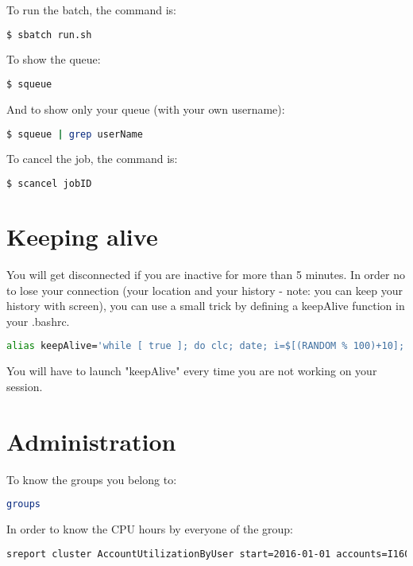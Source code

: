 To run the batch, the command is:
\begin{lstlisting}[language=bash]
  $ sbatch run.sh
\end{lstlisting}


To show the queue:
\begin{lstlisting}[language=bash]
  $ squeue
\end{lstlisting}

And to show only your queue (with your own username):
\begin{lstlisting}[language=bash]
  $ squeue | grep userName
\end{lstlisting}


To cancel the job, the command is:
\begin{lstlisting}[language=bash]
  $ scancel jobID
\end{lstlisting}


\section{Keeping alive}

You will get disconnected if you are inactive for more than 5 minutes. In order no to lose your connection (your location and your history - note: you can keep your history with screen), you can use a small trick by defining a keepAlive function in your .bashrc.


\begin{lstlisting}[language=bash]
alias keepAlive='while [ true ]; do clc; date; i=$[(RANDOM % 100)+10]; sleep $i; done'
\end{lstlisting}

You will have to launch "keepAlive" every time you are not working on your session.

\section{Administration}

To know the groups you belong to:
\begin{lstlisting}[language=bash]
groups
\end{lstlisting}

In order to know the CPU hours by everyone of the group:
\begin{lstlisting}[language=bash]
sreport cluster AccountUtilizationByUser start=2016-01-01 accounts=I1608251 -t hours
\end{lstlisting}

